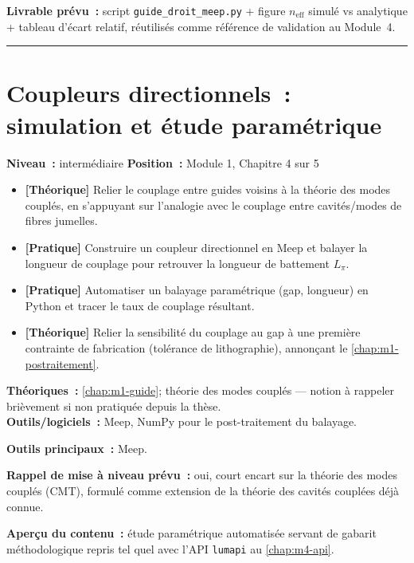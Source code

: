 \noindent\textbf{Livrable prévu~:} script \texttt{guide\_droit\_meep.py} + figure $n_{\text{eff}}$ simulé vs analytique + tableau d'écart relatif, réutilisés comme référence de validation au Module~4.

\bigskip\hrule\bigskip

\chapter{Coupleurs directionnels~: simulation et étude paramétrique}
\label{chap:m1-coupleur}

\noindent\textbf{Niveau~:} intermédiaire \hfill \textbf{Position~:} Module 1, Chapitre 4 sur 5

\begin{objectifs}
\begin{itemize}[leftmargin=1.4em]
  \item \textbf{[Théorique]} Relier le couplage entre guides voisins à la théorie des modes couplés, en s'appuyant sur l'analogie avec le couplage entre cavités/modes de fibres jumelles.
  \item \textbf{[Pratique]} Construire un coupleur directionnel en Meep et balayer la longueur de couplage pour retrouver la longueur de battement $L_\pi$.
  \item \textbf{[Pratique]} Automatiser un balayage paramétrique (gap, longueur) en Python et tracer le taux de couplage résultant.
  \item \textbf{[Théorique]} Relier la sensibilité du couplage au gap à une première contrainte de fabrication (tolérance de lithographie), annonçant le \cref{chap:m1-postraitement}.
\end{itemize}
\end{objectifs}

\begin{prerequis}
\textbf{Théoriques~:} \cref{chap:m1-guide}; théorie des modes couplés — notion à rappeler brièvement si non pratiquée depuis la thèse.\\
\textbf{Outils/logiciels~:} Meep, NumPy pour le post-traitement du balayage.
\end{prerequis}

\noindent\textbf{Outils principaux~:} Meep.

\noindent\textbf{Rappel de mise à niveau prévu~:} oui, court encart sur la théorie des modes couplés (CMT), formulé comme extension de la théorie des cavités couplées déjà connue.

\noindent\textbf{Aperçu du contenu~:} étude paramétrique automatisée servant de gabarit méthodologique repris tel quel avec l'API \texttt{lumapi} au \cref{chap:m4-api}.

